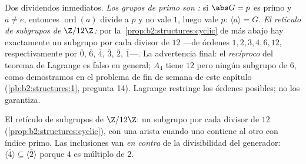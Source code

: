 \begin{example}\label{ex:b2:structures:lagrangeapp}
Dos dividendos inmediatos. \emph{Los grupos de  primo son
:} si $\abs G = p$ es primo y $a \neq e$, entonces
$\operatorname{ord}(a)$ divide a $p$ y no vale $1$, luego vale $p$:
$\langle a\rangle = G$. \emph{El retículo de subgrupos de
$\Z/12\Z$:} por la~\cref{prop:b2:structures:cyclic} de más abajo hay
exactamente un subgrupo por cada divisor de $12$ ---de órdenes $1, 2,
3, 4, 6, 12$,  respectivamente por $\overline 0$,
$\overline 6$, $\overline 4$, $\overline 3$, $\overline 2$,
$\overline 1$---. La advertencia final: el \emph{recíproco} del
teorema de Lagrange es falso en general; $A_4$ tiene  $12$ pero
ningún subgrupo de  $6$, como demostramos en el problema de fin
de semana de este capítulo (\cref{pb:b2:structures:1}, pregunta 14).
Lagrange restringe los órdenes posibles; no los garantiza.
\end{example}

\begin{omfigure}

{\small El retículo de subgrupos de $\Z/12\Z$: un subgrupo por cada
divisor de $12$ (\cref{prop:b2:structures:cyclic}), con una arista
cuando uno contiene al otro con índice primo. Las inclusiones van
\emph{en contra} de la divisibilidad del generador: $\langle\overline
4\rangle \subseteq \langle\overline2\rangle$ porque $4$ es múltiplo
de $2$.}
\end{omfigure}

